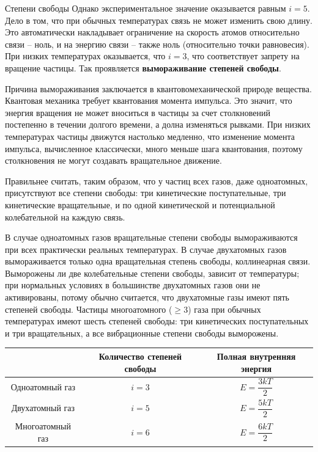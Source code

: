 \documentclass{article}
\begin{document}
\begin{section}{Степени свободы}
		Однако экспериментальное значение оказывается равным $i = 5$. Дело в том, что при обычных температурах связь не может изменить свою длину. Это автоматически накладывает ограничение на скорость атомов относительно связи -- ноль, и на энергию связи -- также ноль (относительно точки равновесия). При низких температурах оказывается, что $i = 3$, что соответствует запрету на вращение частицы. Так проявляется \textbf{вымораживание степеней свободы}.

		Причина вымораживания заключается в квантовомеханической природе вещества. Квантовая механика требует квантования момента импульса. Это значит, что энергия вращения не может вноситься в частицы за счет столкновений постепенно в течении долгого времени, а долна изменяться рывками. При низких температурах частицы движутся настолько медленно, что изменение момента импульса, вычисленное классически, много меньше шага квантования, поэтому столкновения не могут создавать вращательное движение.

		Правильнее считать, таким образом, что у частиц всех газов, даже одноатомных, присутствуют все степени свободы: три кинетические поступательные, три кинетические вращательные, и по одной кинетической и потенциальной колебательной на каждую связь.

		В случае одноатомных газов вращательные степени свободы вымораживаются при всех практически реальных температурах. В случае двухатомных газов вымораживается только одна вращательная степень свободы, коллинеарная связи. Выморожены ли две колебательные степени свободы, зависит от температуры; при нормальных условиях в большинстве двухатомных газов они не активированы, потому обычно считается, что двухатомные газы имеют пять степеней свободы. Частицы многоатомного ($\ge 3$) газа при обычных температурах имеют шесть степеней свободы: три кинетических поступательных и три вращательных, а все вибрационные степени свободы выморожены.

		\def\arraystretch{2.5}
		\begin{tabular}{c|c|c}
			& Количество степеней свободы & Полная внутренняя энергия \\ \hline
			Одноатомный газ & $i = 3$ & $E = \dfrac{3kT}{2}$ \\
			Двухатомный газ & $i = 5$ & $E = \dfrac{5kT}{2}$ \\
			Многоатомный газ & $i = 6$ & $E = \dfrac{6kT}{2}$
		\end{tabular}
	\end{section}
\end{document}

